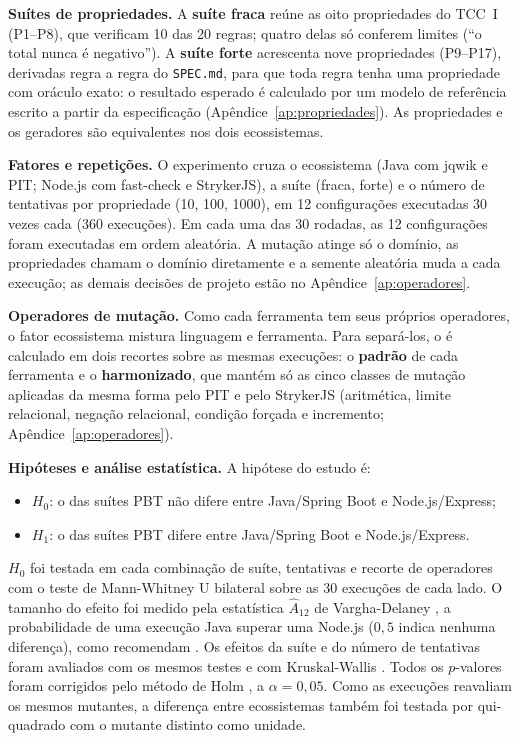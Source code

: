\textbf{Suítes de propriedades.} A \textbf{suíte fraca} reúne as oito propriedades do TCC~I (P1--P8), que verificam 10 das 20 regras; quatro delas só conferem limites (``o total nunca é negativo''). A \textbf{suíte forte} acrescenta nove propriedades (P9--P17), derivadas regra a regra do \texttt{SPEC.md}, para que toda regra tenha uma propriedade com oráculo exato: o resultado esperado é calculado por um modelo de referência escrito a partir da especificação (Apêndice~\ref{ap:propriedades}). As propriedades e os geradores são equivalentes nos dois ecossistemas.

\textbf{Fatores e repetições.} O experimento cruza o ecossistema (Java com jqwik e PIT; Node.js com fast-check e StrykerJS), a suíte (fraca, forte) e o número de tentativas por propriedade (10, 100, 1000), em 12 configurações executadas 30 vezes cada (360 execuções). Em cada uma das 30 rodadas, as 12 configurações foram executadas em ordem aleatória. A mutação atinge só o domínio, as propriedades chamam o domínio diretamente e a semente aleatória muda a cada execução; as demais decisões de projeto estão no Apêndice~\ref{ap:operadores}.

\textbf{Operadores de mutação.} Como cada ferramenta tem seus próprios operadores, o fator ecossistema mistura linguagem e ferramenta. Para separá-los, o \ms{} é calculado em dois recortes sobre as mesmas execuções: o \textbf{padrão} de cada ferramenta e o \textbf{harmonizado}, que mantém só as cinco classes de mutação aplicadas da mesma forma pelo PIT e pelo StrykerJS (aritmética, limite relacional, negação relacional, condição forçada e incremento; Apêndice~\ref{ap:operadores}).

\textbf{Hipóteses e análise estatística.} A hipótese do estudo é:
\begin{itemize}[itemsep=0pt, topsep=2pt]
  \item $H_0$: o \ms{} das suítes PBT não difere entre Java/Spring Boot e Node.js/\allowbreak Express;
  \item $H_1$: o \ms{} das suítes PBT difere entre Java/Spring Boot e Node.js/Express.
\end{itemize}
$H_0$ foi testada em cada combinação de suíte, tentativas e recorte de operadores com o teste de Mann-Whitney U bilateral \citep{mann1947test} sobre as 30 execuções de cada lado. O tamanho do efeito foi medido pela estatística $\hat{A}_{12}$ de Vargha-Delaney \citep{vargha2000a12}, a probabilidade de uma execução Java superar uma Node.js ($0{,}5$ indica nenhuma diferença), como recomendam \citet{arcuri2011guide}. Os efeitos da suíte e do número de tentativas foram avaliados com os mesmos testes e com Kruskal-Wallis \citep{kruskal1952}. Todos os $p$-valores foram corrigidos pelo método de Holm \citep{holm1979}, a $\alpha = 0{,}05$. Como as execuções reavaliam os mesmos mutantes, a diferença entre ecossistemas também foi testada por qui-quadrado com o mutante distinto como unidade.

